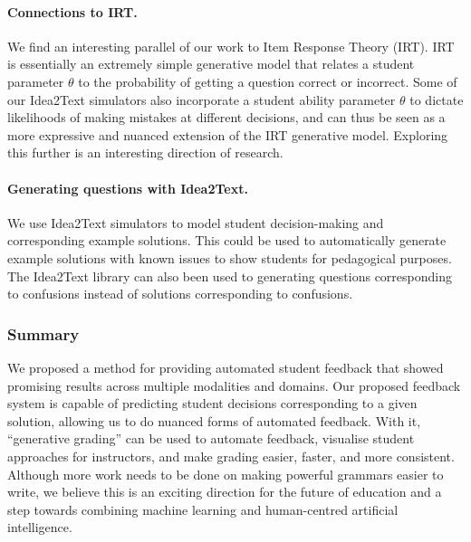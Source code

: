 \paragraph{Connections to IRT.} We find an interesting parallel of our work to Item Response Theory (IRT). IRT is essentially an extremely simple generative model that relates a student parameter $\theta$ to the probability of getting a question correct or incorrect. Some of our Idea2Text simulators also incorporate a student ability parameter $\theta$ to dictate likelihoods of making mistakes at different decisions, and can thus be seen as a more expressive and nuanced extension of the IRT generative model. Exploring this further is an interesting direction of research.

\paragraph{Generating questions with Idea2Text.}
We use Idea2Text simulators to model student decision-making and corresponding example solutions. This could be used to automatically generate example solutions with known issues to show students for pedagogical purposes. The Idea2Text library can also been used to generating questions corresponding to confusions instead of solutions corresponding to confusions.

\subsubsection{Summary}
We proposed a method for providing automated student feedback that showed promising results across multiple modalities and domains. 
Our proposed feedback system is capable of predicting student decisions corresponding to a given solution, allowing us to do nuanced forms of automated feedback. With it, ``generative grading'' can be used to automate feedback, visualise student approaches for instructors, and make grading easier, faster, and more consistent. Although more work needs to be done on making powerful grammars easier to write, we believe this is an exciting direction for the future of education and a step towards combining machine learning and human-centred artificial intelligence.
